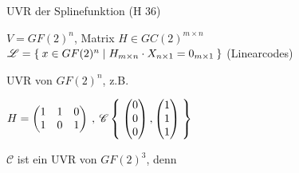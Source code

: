 \documentclass{../tudscript}
\begin{document}
\newcommand{\ilmath}[1]{\begin{flalign*}#1\end{flalign*}}
\newcommand{\vect}[1]{\begin{pmatrix}#1\end{pmatrix}}
\makeatletter

\hypertarget{beispiele-fuxfcr-vektorruxe4ume-aus-der-informatik}{%
\label{beispiele-fuxfcr-vektorruxe4ume-aus-der-informatik}}

\hypertarget{section}{%
\label{section}}

UVR der Splinefunktion (H 36)

\hypertarget{section-1}{%
\label{section-1}}

\(V = GF(2)^n\), Matrix \(H \in GC(2)^{m \times n}\)
\(\mathscr{L} = \Set{x \in GF(2)^n | H_{m \times n} \cdot X_{n \times 1} = 0_{m \times 1}}\)
(Linearcodes)

UVR von \(GF(2)^n\), z.B.

\(H = \begin{pmatrix}1&1&0\\1&0&1 \end{pmatrix} \> , \> \mathscr{C}\Set{\begin{pmatrix}0\\0\\0\end{pmatrix}, \begin{pmatrix}1\\1\\1\end{pmatrix}}\)

\(\mathscr{C}\) ist ein UVR von \(GF(2)^3\), denn
\end{document}
